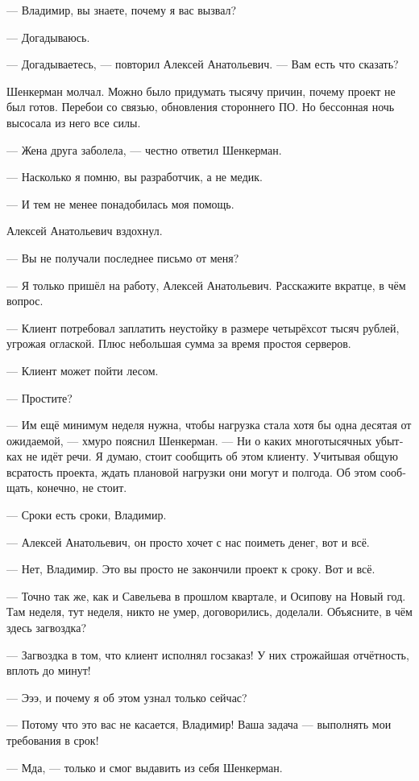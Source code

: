 \documentclass[a5paper,12pt,fleqn]{extbook}\usepackage{cooltooltips}\usepackage{polyglossia}\setdefaultlanguage[babelshorthands=true]{russian}\setotherlanguage{english}\defaultfontfeatures{Ligatures=TeX,Mapping=tex-text} \usepackage{xcolor}\definecolor{lightgray}{HTML}{bbbbbb}\color{lightgray}\newcommand{\ml}[3]{\textenglish{\textcolor{black}{#3}}}
\begin{document}
--- Владимир, вы знаете, почему я вас вызвал?

--- Догадываюсь.

--- Догадываетесь, --- повторил Алексей Анатольевич.
--- Вам есть что сказать?

Шенкерман молчал.
Можно было придумать тысячу причин, почему проект не был готов.
Перебои со связью, обновления стороннего ПО.
Но бессонная ночь высосала из него все силы.

--- Жена друга заболела, --- честно ответил Шенкерман.

--- Насколько я помню, вы разработчик, а не медик.

--- И тем не менее понадобилась моя помощь.

Алексей Анатольевич вздохнул.

--- Вы не получали последнее письмо от меня?

--- Я только пришёл на работу, Алексей Анатольевич.
Расскажите вкратце, в чём вопрос.

--- Клиент потребовал заплатить неустойку в размере четырёхсот тысяч рублей, угрожая оглаской.
Плюс небольшая сумма за время простоя серверов.

--- Клиент может пойти лесом.

--- Простите?

--- Им ещё минимум неделя нужна, чтобы нагрузка стала хотя бы одна десятая от ожидаемой, --- хмуро пояснил Шенкерман.
--- Ни о каких многотысячных убытках не идёт речи.
Я думаю, стоит сообщить об этом клиенту.
Учитывая общую всратость проекта, ждать плановой нагрузки они могут и полгода.
Об этом сообщать, конечно, не стоит.

--- Сроки есть сроки, Владимир.

--- Алексей Анатольевич, он просто хочет с нас поиметь денег, вот и всё.

--- Нет, Владимир.
Это вы просто не закончили проект к сроку.
Вот и всё.

--- Точно так же, как и Савельева в прошлом квартале, и Осипову на Новый год.
Там неделя, тут неделя, никто не умер, договорились, доделали.
Объясните, в чём здесь загвоздка?

--- Загвоздка в том, что клиент исполнял госзаказ!
У них строжайшая отчётность, вплоть до минут!

--- Эээ, и почему я об этом узнал только сейчас?

--- Потому что это вас не касается, Владимир!
Ваша задача --- выполнять мои требования в срок!

--- Мда, --- только и смог выдавить из себя Шенкерман.
\end{document}
